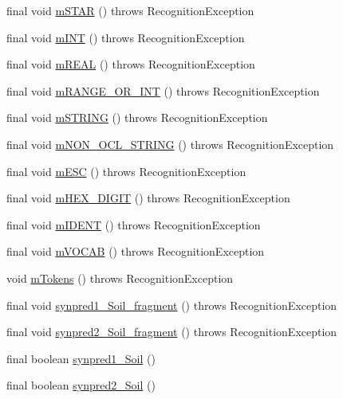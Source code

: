 \begin{DoxyCompactItemize}
\item 
final void \hyperlink{classorg_1_1tzi_1_1use_1_1parser_1_1soil_1_1_soil_lexer_a48a1f050e87ad6692943d38cfdd27205}{m\-S\-T\-A\-R} ()  throws Recognition\-Exception 
\item 
final void \hyperlink{classorg_1_1tzi_1_1use_1_1parser_1_1soil_1_1_soil_lexer_a26cd1b262c2588736222860fea694e98}{m\-I\-N\-T} ()  throws Recognition\-Exception 
\item 
final void \hyperlink{classorg_1_1tzi_1_1use_1_1parser_1_1soil_1_1_soil_lexer_a059c03401a500f562b3d1e1e45d70b29}{m\-R\-E\-A\-L} ()  throws Recognition\-Exception 
\item 
final void \hyperlink{classorg_1_1tzi_1_1use_1_1parser_1_1soil_1_1_soil_lexer_a4ac3f05413ac875cbfd42b478ac8a575}{m\-R\-A\-N\-G\-E\-\_\-\-O\-R\-\_\-\-I\-N\-T} ()  throws Recognition\-Exception 
\item 
final void \hyperlink{classorg_1_1tzi_1_1use_1_1parser_1_1soil_1_1_soil_lexer_add5f2b724a70326d12a033551ad3d9e1}{m\-S\-T\-R\-I\-N\-G} ()  throws Recognition\-Exception 
\item 
final void \hyperlink{classorg_1_1tzi_1_1use_1_1parser_1_1soil_1_1_soil_lexer_ad817f89939ceb676e71669688b24cb80}{m\-N\-O\-N\-\_\-\-O\-C\-L\-\_\-\-S\-T\-R\-I\-N\-G} ()  throws Recognition\-Exception 
\item 
final void \hyperlink{classorg_1_1tzi_1_1use_1_1parser_1_1soil_1_1_soil_lexer_a24b75656b5ba8683710323596ddc2eb9}{m\-E\-S\-C} ()  throws Recognition\-Exception 
\item 
final void \hyperlink{classorg_1_1tzi_1_1use_1_1parser_1_1soil_1_1_soil_lexer_a3163dba8bc2056583c071f5432980a75}{m\-H\-E\-X\-\_\-\-D\-I\-G\-I\-T} ()  throws Recognition\-Exception 
\item 
final void \hyperlink{classorg_1_1tzi_1_1use_1_1parser_1_1soil_1_1_soil_lexer_aa911f55999cf495dc1bdd036e17f9c78}{m\-I\-D\-E\-N\-T} ()  throws Recognition\-Exception 
\item 
final void \hyperlink{classorg_1_1tzi_1_1use_1_1parser_1_1soil_1_1_soil_lexer_ac63e9a644511b4ef7e1a075589028f83}{m\-V\-O\-C\-A\-B} ()  throws Recognition\-Exception 
\item 
void \hyperlink{classorg_1_1tzi_1_1use_1_1parser_1_1soil_1_1_soil_lexer_acfa654a8cbe8c173b547f7a1a8e7ee5f}{m\-Tokens} ()  throws Recognition\-Exception 
\item 
final void \hyperlink{classorg_1_1tzi_1_1use_1_1parser_1_1soil_1_1_soil_lexer_a019c722765d09317ca80c15d80c8f907}{synpred1\-\_\-\-Soil\-\_\-fragment} ()  throws Recognition\-Exception 
\item 
final void \hyperlink{classorg_1_1tzi_1_1use_1_1parser_1_1soil_1_1_soil_lexer_afdc0bb30516ba96a496b2bc0c1f3ce8c}{synpred2\-\_\-\-Soil\-\_\-fragment} ()  throws Recognition\-Exception 
\item 
final boolean \hyperlink{classorg_1_1tzi_1_1use_1_1parser_1_1soil_1_1_soil_lexer_a3f32a6d1f796b01a4060a7d87af1ad84}{synpred1\-\_\-\-Soil} ()
\item 
final boolean \hyperlink{classorg_1_1tzi_1_1use_1_1parser_1_1soil_1_1_soil_lexer_a5dfd0eda743c1ec670287da4aaa502d5}{synpred2\-\_\-\-Soil} ()
\end{DoxyCompactItemize}
